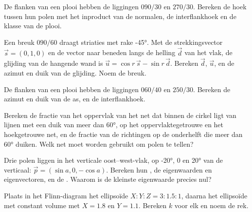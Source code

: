 \begin{exercise}[$\star$]\label{exo:b3:structural-analysis:3}
De flanken van een plooi hebben de liggingen $090/30$ en $270/30$. Bereken de
hoek tussen hun polen met het inproduct van de normalen, de interflankhoek
en de klasse van de plooi.
\end{exercise}

\begin{exercise}[$\star$]\label{exo:b3:structural-analysis:4}
Een breuk $090/60$ draagt striaties met rake \ang{-45}. Met de strekkingsvector
$\vec s = (0, 1, 0)$ en de vector naar beneden langs de helling $\vec d$ van het vlak, de
glijding van de hangende wand is $\vec u = \cos r\,\vec s - \sin r\,\vec d$. Bereken
$\vec d$, $\vec u$, en de azimut en duik van de glijding. Noem de breuk.
\end{exercise}

\begin{exercise}[$\star\star$]\label{exo:b3:structural-analysis:5}
De flanken van een plooi hebben de liggingen $060/40$ en $250/30$. Bereken de
azimut en duik van de as, en de interflankhoek.
\end{exercise}

\begin{exercise}[$\star\star$]\label{exo:b3:structural-analysis:6}
Bereken de fractie van het oppervlak van het net dat binnen de cirkel ligt van
lijnen met een duik van meer dan \ang{60}, op het oppervlaktegetrouwe en het hoekgetrouwe
net, en de fractie van de richtingen op de onderhelft die
meer dan \ang{60} duiken. Welk net moet worden gebruikt om polen te tellen?
\end{exercise}

\begin{exercise}[$\star\star$]\label{exo:b3:structural-analysis:7}
Drie polen liggen in het verticale oost--west-vlak, op \ang{-20}, $0$ en
\ang{20} van de verticaal: $\vec p = (\sin a, 0, -\cos a)$. Bereken hun
, de eigenwaarden en eigenvectoren, en de . Waarom
is de kleinste eigenwaarde precies nul?
\end{exercise}

\begin{exercise}[$\star\star$]\label{exo:b3:structural-analysis:8}
Plaats in het Flinn-diagram het ellipsoïde $X : Y : Z = 3 : 1.5 : 1$, daarna het
ellipsoïde met constant volume met $X = 1.8$ en $Y = 1.1$. Bereken $k$ voor
elk en noem de rek.
\end{exercise}

